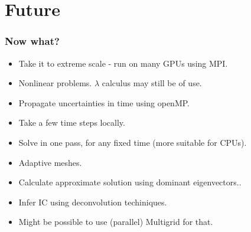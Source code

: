 \documentclass[]{beamer}
\begin{document}
\section{Future}
\begin{frame}
  \frametitle{Now what?}   %
 
  \begin{itemize}
  \item<1-> Take it to extreme scale - run on many GPUs using MPI.
  \item<2-> Nonlinear problems. $\lambda$ calculus may still be of use.
  \item<3-> Propagate uncertainties in time using openMP.
  \item<4-> Take a few time steps locally.
  \item<5-> Solve in one pass, for any fixed time (more suitable for CPUs).
  \item<6-> Adaptive meshes.
  \item<7-> Calculate approximate solution using dominant eigenvectors..
  \item<8-> Infer IC using deconvolution techiniques.
  \item<8-> Might be possible to use (parallel) Multigrid for that.
  \end{itemize}
\end{frame}
\end{document}
